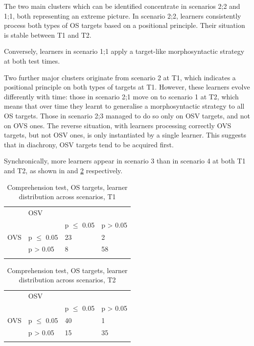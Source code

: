 The two main clusters which can be identified concentrate in scenarios 2;2 and 1;1, both representing an extreme picture. In scenario 2;2, learners consistently process both types of OS targets based on a positional principle. Their situation is stable between T1 and T2. 

Conversely, learners in scenario 1;1 apply a target-like morphosyntactic strategy at both test times. 

Two further major clusters originate from scenario 2 at T1, which indicates a positional principle on both types of targets at T1. However, these learners evolve differently with time: those in scenario 2;1 move on to scenario 1 at T2, which means that over time they learnt to generalise a morphosyntactic strategy to all OS targets. Those in scenario 2;3 managed to do so only on OSV targets, and not on OVS ones. The reverse situation, with learners processing correctly OVS targets, but not OSV ones, is only instantiated by a single learner. This suggests that in diachrony, OSV targets tend to be acquired first.

Synchronically, more learners appear in scenario 3 than in scenario 4 at both T1 and T2, as shown in  and \ref{tab:05:8} respectively.

\begin{table}
    \begin{tabularx}{\textwidth}{XXXX}
    \lsptoprule
    \multicolumn{2}{X}{} & \multicolumn{2}{X}{OSV}\\
    &  & p ${\leq}$ 0.05 & p > 0.05\\
    \multicolumn{1}{X}{OVS} & p ${\leq}$ 0.05 & 23 & 2\\
    & p > 0.05 & 8 & 58\\
    \lspbottomrule
    \end{tabularx}
    \caption{Comprehension test, OS targets, learner distribution across scenarios, T1}
    \label{tab:05:7}
\end{table}

\begin{table}
    \begin{tabularx}{\textwidth}{XXXX}
    \lsptoprule
    \multicolumn{2}{X}{} & \multicolumn{2}{X}{OSV}\\
    &  & p ${\leq}$ 0.05 & p > 0.05\\
    \multicolumn{1}{X}{OVS} & p ${\leq}$ 0.05 & 40 & 1\\
    & p > 0.05 & 15 & 35\\
    \lspbottomrule
    \end{tabularx}
    \caption{Comprehension test, OS targets, learner distribution across scenarios, T2}
    \label{tab:05:8}
\end{table}

